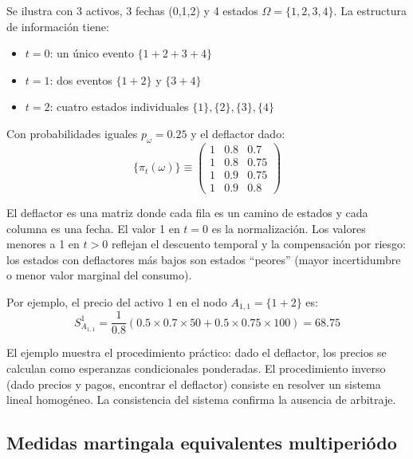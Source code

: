 \documentclass[12pt]{article}
\begin{document}
Se ilustra con 3 activos, 3 fechas (0,1,2) y 4 estados $\Omega = \{1,2,3,4\}$. La estructura de informaci\'on tiene:
\begin{itemize}
    \item $t=0$: un \'unico evento $\{1+2+3+4\}$
    \item $t=1$: dos eventos $\{1+2\}$ y $\{3+4\}$
    \item $t=2$: cuatro estados individuales $\{1\},\{2\},\{3\},\{4\}$
\end{itemize}

Con probabilidades iguales $p_\omega = 0.25$ y el deflactor dado:
\begin{equation}
    \{\pi_t(\omega)\} \equiv \begin{pmatrix} 1 & 0.8 & 0.7 \\ 1 & 0.8 & 0.75 \\ 1 & 0.9 & 0.75 \\ 1 & 0.9 & 0.8 \end{pmatrix}
\end{equation}

\begin{intuicionmat}
El deflactor es una matriz donde cada fila es un camino de estados y cada columna es una fecha. El valor 1 en $t=0$ es la normalizaci\'on. Los valores menores a 1 en $t>0$ reflejan el descuento temporal y la compensaci\'on por riesgo: los estados con deflactores m\'as bajos son estados ``peores'' (mayor incertidumbre o menor valor marginal del consumo).
\end{intuicionmat}

Por ejemplo, el precio del activo 1 en el nodo $A_{1,1} = \{1+2\}$ es:
\begin{equation}
    S^1_{A_{1,1}} = \frac{1}{0.8}(0.5 \times 0.7 \times 50 + 0.5 \times 0.75 \times 100) = 68.75
\end{equation}

\begin{intuicion}
El ejemplo muestra el procedimiento pr\'actico: dado el deflactor, los precios se calculan como esperanzas condicionales ponderadas. El procedimiento inverso (dado precios y pagos, encontrar el deflactor) consiste en resolver un sistema lineal homog\'eneo. La consistencia del sistema confirma la ausencia de arbitraje.
\end{intuicion}

\subsection{Medidas martingala equivalentes multiperi\'odo}
\end{document}
